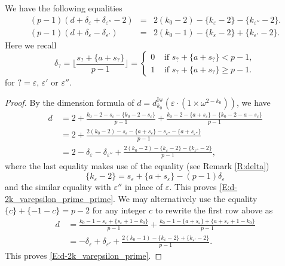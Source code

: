 \begin{lemma}
    \label{L:d-2k}
    We have the following equalities
    \begin{eqnarray}
    \label{E:d-2k_varepsilon_prime_prime}
    (p-1)(d + \delta_\varepsilon + \delta_{\varepsilon''}-2) &=& 2(k_0 -2)  - \{k_\varepsilon -2\} - \{k_{\varepsilon''} - 2\}.
    \\
    \label{E:d-2k_varepsilon_prime}
    (p-1)(d + \delta_\varepsilon - \delta_{\varepsilon'}) &=& 2(k_0-1) - \{k_\varepsilon - 2\} + \{k_{\varepsilon'}-2\}.
    \end{eqnarray}
    Here we recall
    $$
    \delta_? = \Big\lfloor \frac{s_? + \{a+s_?\}}{p-1}\Big \rfloor = \begin{cases}
    0 & \textrm{ if }s_? + \{a+s_?\} < p-1,\\
    1 & \textrm{ if }s_? + \{a+s_?\} \geq p-1.
    \end{cases}
    $$
    for $?=\varepsilon$, $\varepsilon'$ or $\varepsilon''$.
\end{lemma}

\begin{proof}
    By the dimension formula of $d = d_{k_0}^{{\mathrm{Iw}}}(\varepsilon \cdot(1\times \omega^{2-k_0}))$, we have
    \begin{align*}
    d\, &=2+ \frac{k_0-2-s_\varepsilon-\{k_0-2-s_\varepsilon\}}{p-1} + \frac{k_0-2-\{a+s_\varepsilon\}-\{k_0-2-a-s_\varepsilon\}}{p-1}
    \\
    & = 2 + \frac{2(k_0-2) - s_\varepsilon - \{a+s_\varepsilon\} -s_{\varepsilon''} -  \{a+s_{\varepsilon''}\}}{p-1}
    \\
    & = 2-\delta_\varepsilon -\delta_{\varepsilon''}+ \frac{2(k_0-2) - \{k_\varepsilon -2\} - \{k_{\varepsilon''} - 2\}}{p-1},
    \end{align*}
    where the last equality makes use of the equality (see Remark \ref{R:delta})
    \begin{equation}
    \label{E:k-delta}
    \{k_\varepsilon - 2\} = s_\varepsilon + \{a+s_\varepsilon\} - (p-1)\delta_\varepsilon
    \end{equation}
    and the similar equality with $\varepsilon''$ in place of $\varepsilon$. This proves \eqref{E:d-2k_varepsilon_prime_prime}.
    We may alternatively use the equality $\{c\} + \{-1-c\} = p-2$ for any integer $c$ to rewrite the first row above as
    \begin{align*}
    d\, &= \frac{k_0-1-s_\varepsilon+\{s_\varepsilon+1-k_0\}}{p-1} + \frac{k_0-1-\{a+s_\varepsilon\}+\{a+s_\varepsilon+1-k_0\}}{p-1}
    \\
    & = - \delta_{\varepsilon} + \delta_{\varepsilon'} + \frac{2(k_0-1) -\{k_\varepsilon -2\} +\{k_{\varepsilon'} - 2\}}{p-1}.
    \end{align*}
    This proves \eqref{E:d-2k_varepsilon_prime}.
\end{proof}

